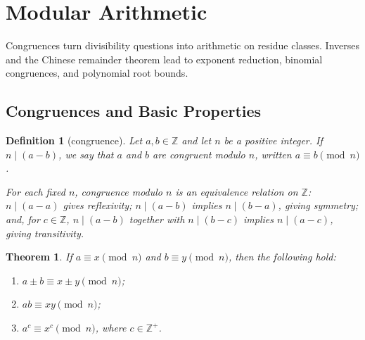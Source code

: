 \documentclass[11pt]{article}
\theoremstyle{ntstyle}
\newtheorem{theorem}{Theorem}[subsection]
\newtheorem{definition}{Definition}[subsection]
\begin{document}
\section{Modular Arithmetic}

Congruences turn divisibility questions into arithmetic on residue classes. Inverses and the Chinese remainder
theorem lead to exponent reduction, binomial congruences, and polynomial root bounds.

\subsection{Congruences and Basic Properties}

\begin{definition}[congruence]\label{def:3.1.1} Let $a, b \in \mathbb{Z}$ and let $n$ be a
	positive integer. If $n \mid (a - b)$, we say that $a$ and $b$ are congruent modulo $n$, written $a \equiv b \pmod{n}$.

	For each fixed $n$, congruence modulo $n$ is an equivalence relation on
	$\mathbb{Z}$: $n\mid(a-a)$ gives reflexivity; $n\mid(a-b)$ implies
	$n\mid(b-a)$, giving symmetry; and, for $c\in\mathbb{Z}$, $n\mid(a-b)$ together with
	$n\mid(b-c)$ implies $n\mid(a-c)$, giving transitivity.
\end{definition}
\begin{theorem}\label{thm:3.1.1} If $a \equiv x \pmod{n}$ and $b
		\equiv y \pmod{n}$, then the following hold:

	\begin{enumerate}[label={\alph*)}]
		\item $a \pm b \equiv x \pm y \pmod{n}$;
		\item $ab \equiv xy \pmod{n}$;
		\item $a^{c} \equiv x^{c} \pmod{n}$, where $c \in \mathbb{Z}^+$.
	\end{enumerate}
\end{theorem}
\end{document}
